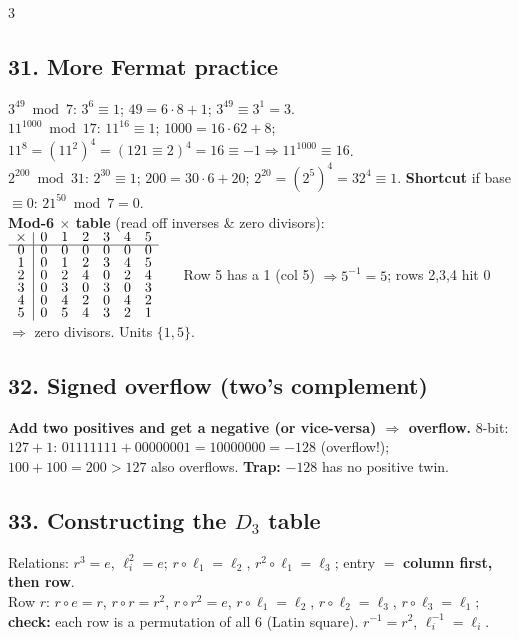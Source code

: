 \documentclass[9pt]{extarticle}
\newcommand{\hl}[1]{\textbf{\textcolor{BrickRed}{#1}}}
\begin{document}
\begin{multicols}{3}
\subsection{31. More Fermat practice}
\begin{sloppypar}\raggedright
$3^{49}\bmod7$: $3^6\equiv1$; $49{=}6{\cdot}8{+}1$; $3^{49}\equiv3^1{=}3$.\\
$11^{1000}\bmod17$: $11^{16}\equiv1$; $1000{=}16{\cdot}62{+}8$; $11^8{=}(11^2)^4{=}(121\equiv2)^4{=}16\equiv-1\Rightarrow11^{1000}\equiv16$.\\
$2^{200}\bmod31$: $2^{30}\equiv1$; $200{=}30{\cdot}6{+}20$; $2^{20}{=}(2^5)^4{=}32^4\equiv1$. \hl{Shortcut} if base $\equiv0$: $21^{50}\bmod7{=}0$.\\
\textbf{Mod-6 $\times$ table} (read off inverses \& zero divisors):\\
${\renewcommand{\arraystretch}{0.74}\begin{array}{c|cccccc}\times&0&1&2&3&4&5\\\hline0&0&0&0&0&0&0\\1&0&1&2&3&4&5\\2&0&2&4&0&2&4\\3&0&3&0&3&0&3\\4&0&4&2&0&4&2\\5&0&5&4&3&2&1\end{array}}$
$\quad$ Row 5 has a 1 (col 5) $\Rightarrow5^{-1}{=}5$; rows 2,3,4 hit 0 $\Rightarrow$ zero divisors. Units $\{1,5\}$.
\end{sloppypar}

\subsection{32. Signed overflow (two's complement)}
\begin{sloppypar}\raggedright
\textbf{Add two positives and get a negative (or vice-versa) $\Rightarrow$ overflow.} 8-bit: $127{+}1$: $01111111{+}00000001{=}10000000{=}-128$ (overflow!); $100{+}100{=}200>127$ also overflows. \hl{Trap:} $-128$ has no positive twin.
\end{sloppypar}

\subsection{33. Constructing the $D_3$ table}
\begin{sloppypar}\raggedright
Relations: $r^3{=}e$, $\ell_i^2{=}e$; $r{\circ}\ell_1{=}\ell_2$, $r^2{\circ}\ell_1{=}\ell_3$; entry $=$ \hl{column first, then row}.\\
Row $r$: $r{\circ}e{=}r$, $r{\circ}r{=}r^2$, $r{\circ}r^2{=}e$, $r{\circ}\ell_1{=}\ell_2$, $r{\circ}\ell_2{=}\ell_3$, $r{\circ}\ell_3{=}\ell_1$; \hl{check:} each row is a permutation of all 6 (Latin square). $r^{-1}{=}r^2$, $\ell_i^{-1}{=}\ell_i$.
\end{sloppypar}


\end{multicols}
\end{document}

